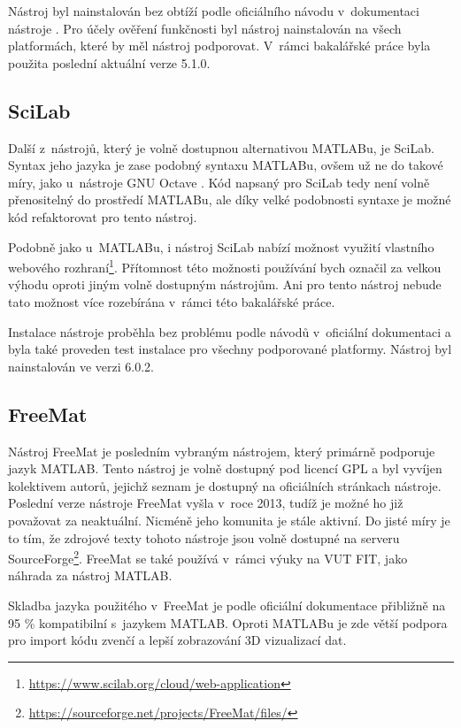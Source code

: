 Nástroj byl nainstalován bez obtíží podle oficiálního návodu v~dokumentaci nástroje \cite{OctaveManual}. Pro účely ověření funkčnosti byl nástroj nainstalován na všech platformách, které by měl nástroj podporovat. V~rámci bakalářské práce byla použita poslední aktuální verze 5.1.0.

\subsection{SciLab}
\label{scilab-desc}
Další z~nástrojů, který je volně dostupnou alternativou MATLABu, je SciLab. Syntax jeho jazyka je zase podobný syntaxu MATLABu, ovšem už ne do takové míry, jako u~nástroje GNU Octave \cite{Gilberto}. Kód napsaný pro SciLab tedy není volně přenositelný do prostředí MATLABu, ale díky velké podobnosti syntaxe je možné kód refaktorovat pro tento nástroj.

Podobně jako u~MATLABu, i nástroj SciLab nabízí možnost využití vlastního webového rozhraní\footnote{\url{https://www.scilab.org/cloud/web-application}}. Přítomnost této možnosti používání bych označil za velkou výhodu oproti jiným volně dostupným nástrojům. Ani pro tento nástroj nebude tato možnost více rozebírána v~rámci této bakalářské práce.

Instalace nástroje proběhla bez problému podle návodů v~oficiální dokumentaci a byla také proveden test instalace pro všechny podporované platformy. Nástroj byl nainstalován ve verzi 6.0.2.

\subsection{FreeMat}
\label{FreeMat-desc}

Nástroj FreeMat je posledním vybraným nástrojem, který primárně podporuje jazyk MATLAB. Tento nástroj je volně dostupný pod licencí GPL a byl vyvíjen kolektivem autorů, jejichž seznam je dostupný na oficiálních stránkach nástroje\cite{FreeMat}. Poslední verze nástroje FreeMat vyšla v~roce 2013, tudíž je možné ho již považovat za neaktuální. Nicméně jeho komunita je stále aktivní. Do jisté míry je to tím, že zdrojové texty tohoto nástroje jsou volně dostupné na serveru SourceForge\footnote{\url{https://sourceforge.net/projects/FreeMat/files/}}. FreeMat se také používá v~rámci výuky na VUT FIT, jako náhrada za nástroj MATLAB.

Skladba jazyka použitého v~FreeMat je podle oficiální dokumentace přibližně na 95 \% kompatibilní s~jazykem MATLAB. Oproti MATLABu je zde větší podpora pro import kódu zvenčí a lepší zobrazování 3D vizualizací dat\cite{FreeMat}.

